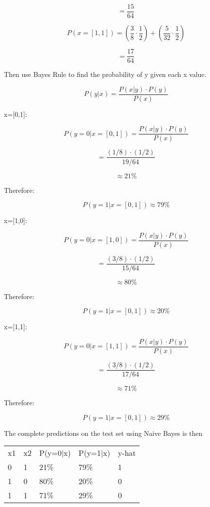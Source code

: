 \documentclass{article}
\begin{document}
$$ = \frac{15}{64} $$

$$ P(x = [1,1]) = \left(\frac{3}{8} \cdot \frac{1}{2}\right) + \left(\frac{5}{32} \cdot \frac{1}{2}\right) $$

$$ = \frac{17}{64} $$

Then use Bayes Rule to find the probability of y given each x value.

$$ P(y|x) = \frac{P(x|y) \cdot P(y)}{P(x)} $$

x=[0,1]:

$$ P(y=0|x=[0,1]) = \frac{P(x|y) \cdot P(y)}{P(x)} $$

$$ = \frac{(1/8) \cdot (1/2)}{19/64} $$

$$ \approx 21\% $$

Therefore:

$$ P(y=1|x=[0,1]) \approx 79\% $$

x=[1,0]:

$$ P(y=0|x=[1,0]) = \frac{P(x|y) \cdot P(y)}{P(x)} $$

$$ = \frac{(3/8) \cdot (1/2)}{15/64} $$

$$ \approx 80\% $$

Therefore:

$$ P(y=1|x=[0,1]) \approx 20\% $$

x=[1,1]:

$$ P(y=0|x=[1,1]) = \frac{P(x|y) \cdot P(y)}{P(x)} $$

$$ = \frac{(3/8) \cdot (1/2)}{17/64} $$

$$ \approx 71\% $$

Therefore:

$$ P(y=1|x=[0,1]) \approx 29\% $$

The complete predictions on the test set using Naive Bayes is then
\begin{table}[h]
	\centering
\begin{tabular}{lllll}
  x1  &  x2  &  P(y=0|x)  &  P(y=1|x)  &  y-hat \\
   0  &   1  &     21\%    &     79\%    &    1 \\
   1  &   0  &     80\%    &     20\%    &    0 \\
   1  &   1  &     71\%    &     29\%    &    0
\end{tabular}
\end{table}
\end{document}
